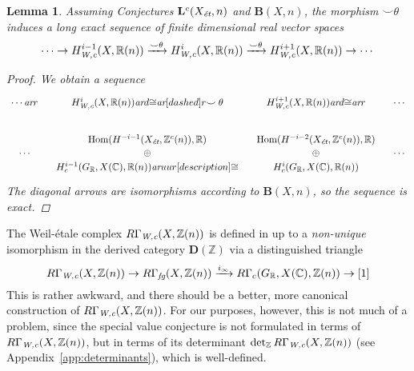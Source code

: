 \documentclass[10pt,a4paper,oneside,draft]{article}
\DeclareMathOperator{\Hom}{Hom}
\newcommand{\CC}{\mathbb{C}}
\newcommand{\RR}{\mathbb{R}}
\newcommand{\ZZ}{\mathbb{Z}}
\renewcommand{\det}{\operatorname{det}}
\newcommand{\ar}{\text{\it ar}}
\newcommand{\et}{\text{\it \'{e}t}}
\newcommand{\fg}{\text{\it fg}}
\newcommand{\Wc}{\text{\it W,c}}
\theoremstyle{myplain}
\newtheorem{lemma}[theorem]{Lemma}
\theoremstyle{mydefinition}
\numberwithin{equation}{section}
\begin{document}
\begin{lemma}
  \label{lemma:smile-theta}
  Assuming Conjectures $\mathbf{L}^c (X_\et,n)$ and $\mathbf{B} (X,n)$, the
  morphism $\smile\theta$ induces a long exact sequence of finite dimensional
  real vector spaces
  \[ \cdots \to H^{i-1}_\Wc (X, \RR (n))
    \xrightarrow{\smile\theta}
    H^i_\Wc (X, \RR (n))
    \xrightarrow{\smile\theta}
    H^{i+1}_\Wc (X, \RR (n)) \to \cdots \]

  \begin{proof}
    We obtain a sequence
    \[ \begin{tikzcd}[column sep=1em]
        \cdots\ar{r} & H^i_\Wc (X, \RR(n))\ar{d}{\cong}\ar[dashed]{r}{\smile\theta} & H^{i+1}_\Wc (X, \RR(n))\ar{d}{\cong} \ar{r} & \cdots \\
        & \Hom (H^{-i-1} (X_\et, \ZZ^c (n)), \RR) & \Hom (H^{-i-2} (X_\et, \ZZ^c (n)), \RR) \\[-2em]
        \cdots & \oplus & \oplus & \cdots \\[-2em]
        & H_c^{i-1} (G_\RR, X (\CC), \RR (n))\ar{uur}[description]{\cong} & H_c^i (G_\RR, X (\CC), \RR (n))
      \end{tikzcd} \]
    The diagonal arrows are isomorphisms according to $\mathbf{B} (X,n)$,
    so the sequence is exact.
  \end{proof}
\end{lemma}

The Weil-\'{e}tale complex $R\Gamma_\Wc (X, \ZZ(n))$ is defined in
\cite[\S 7]{Beshenov-Weil-etale-1} up to a \emph{non-unique} isomorphism in the
derived category $\mathbf{D} (\ZZ)$ via a distinguished triangle
\begin{equation}
  \label{eqn:triangle-defining-RGamma-Wc}
  R\Gamma_\Wc (X, \ZZ(n)) \to R\Gamma_\fg (X,\ZZ(n)) \xrightarrow{i_\infty}
  R\Gamma_c (G_\RR, X (\CC), \ZZ (n)) \to [1]
\end{equation}
This is rather awkward, and there should be a better, more canonical
construction of $R\Gamma_\Wc (X, \ZZ(n))$. For our purposes, however, this is
not much of a problem, since the special value conjecture is not formulated in
terms of $R\Gamma_\Wc (X, \ZZ (n))$, but in terms of its determinant
$\det_\ZZ R\Gamma_\Wc (X, \ZZ(n))$ (see Appendix~\ref{app:determinants}), which
is well-defined.
\end{document}
